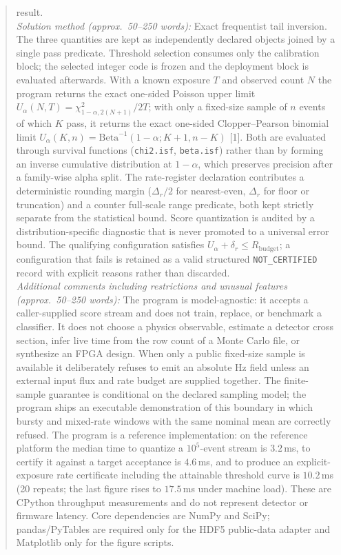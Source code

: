 \documentclass[preprint,12pt]{elsarticle}
\begin{document}
\begin{frontmatter}
\begin{abstract}
\begin{small}
result. \\
{\em Solution method (approx.\ 50--250 words):}
Exact frequentist tail inversion.  The three quantities are kept as
independently declared objects joined by a single pass predicate.  Threshold
selection consumes only the calibration block; the selected integer code is
frozen and the deployment block is evaluated afterwards.  With a known exposure
$T$ and observed count $N$ the program returns the exact one-sided Poisson
upper limit $U_\alpha(N,T)=\chi^2_{1-\alpha,2(N+1)}/2T$; with only a fixed-size
sample of $n$ events of which $K$ pass, it returns the exact one-sided
Clopper--Pearson binomial limit
$U_\alpha(K,n)=\mathrm{Beta}^{-1}(1-\alpha;K+1,n-K)$ [1].  Both are evaluated
through survival functions (\texttt{chi2.isf}, \texttt{beta.isf}) rather than by
forming an inverse cumulative distribution at $1-\alpha$, which preserves
precision after a family-wise alpha split.  The rate-register declaration
contributes a deterministic rounding margin ($\Delta_r/2$ for nearest-even,
$\Delta_r$ for floor or truncation) and a counter full-scale range predicate,
both kept strictly separate from the statistical bound.  Score quantization is
audited by a distribution-specific diagnostic that is never promoted to a
universal error bound.  The qualifying configuration satisfies
$U_\alpha+\delta_r\le R_{\mathrm{budget}}$; a configuration that fails is
retained as a valid structured \texttt{NOT\_CERTIFIED} record with explicit
reasons rather than discarded. \\
{\em Additional comments including restrictions and unusual features
(approx.\ 50--250 words):}
The program is model-agnostic: it accepts a caller-supplied score stream and
does not train, replace, or benchmark a classifier.  It does not choose a
physics observable, estimate a detector cross section, infer live time from the
row count of a Monte Carlo file, or synthesize an FPGA design.  When only a
public fixed-size sample is available it deliberately refuses to emit an
absolute Hz field unless an external input flux and rate budget are supplied
together.  The finite-sample guarantee is conditional on the declared sampling
model; the program ships an executable demonstration of this boundary in which
bursty and mixed-rate windows with the same nominal mean are correctly refused.
The program is a reference implementation: on the reference platform the median
time to quantize a $10^5$-event stream is $3.2$\,ms, to certify it against a
target acceptance is $4.6$\,ms, and to produce an explicit-exposure rate
certificate including the attainable threshold curve is $10.2$\,ms (20 repeats;
the last figure rises to $17.5$\,ms under machine load).  These are CPython
throughput measurements and do not represent detector or firmware latency.  Core
dependencies are NumPy and SciPy; pandas/PyTables are required only for the HDF5
public-data adapter and Matplotlib only for the figure scripts.


\end{small}
\end{abstract}
\end{frontmatter}
\end{document}
